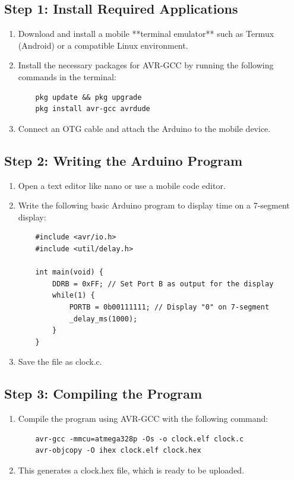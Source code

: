\documentclass[a4paper,12pt]{article}
\begin{document}
\subsection{Step 1: Install Required Applications}
\begin{enumerate}
    \item Download and install a mobile **terminal emulator** such as {Termux} (Android) or a compatible Linux environment.
    \item Install the necessary packages for AVR-GCC by running the following commands in the terminal:
    \begin{verbatim}
    pkg update && pkg upgrade
    pkg install avr-gcc avrdude
    \end{verbatim}
    \item Connect an {OTG cable} and attach the Arduino to the mobile device.
\end{enumerate}

\subsection{Step 2: Writing the Arduino Program}
\begin{enumerate}
    \item Open a text editor like {nano} or use a mobile code editor.
    \item Write the following basic Arduino program to display time on a 7-segment display:
    \begin{verbatim}
    #include <avr/io.h>
    #include <util/delay.h>

    int main(void) {
        DDRB = 0xFF; // Set Port B as output for the display
        while(1) {
            PORTB = 0b00111111; // Display "0" on 7-segment
            _delay_ms(1000);
        }
    }
    \end{verbatim}
    \item Save the file as {clock.c}.
\end{enumerate}

\subsection{Step 3: Compiling the Program}
\begin{enumerate}
    \item Compile the program using AVR-GCC with the following command:
    \begin{verbatim}
    avr-gcc -mmcu=atmega328p -Os -o clock.elf clock.c
    avr-objcopy -O ihex clock.elf clock.hex
    \end{verbatim}
    \item This generates a {clock.hex} file, which is ready to be uploaded.
\end{enumerate}
\end{document}
